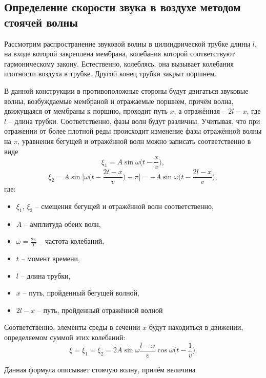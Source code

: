 \documentclass[referat,times]{SCWorks}
\begin{document}
\subsection{Определение скорости звука в воздухе методом стоячей волны}
\par Рассмотрим распространение звуковой волны в цилиндрической трубке длины $l$, на входе которой закреплена мембрана, колебания которой соответствуют гармоническому закону. Естественно, колеблясь, она вызывает колебания плотности воздуха в трубке. Другой конец трубки закрыт поршнем.
\par В данной конструкции в противоположные стороны будут двигаться звуковые волны, возбуждаемые мембраной и отражаемые поршнем, причём волна, движущаяся от мембраны к поршню, проходит путь $x$, а отражённая -- $2l - x$, где $l$ -- длина трубки. Соответственно, фазы волн будут различны. Учитывая, что при отражении от более плотной реды происходит изменение фазы отражённой волны на $\pi$, уравнения бегущей и отражённой волн можно записать соответственно в виде
\begin{equation}
    \xi_1 = A \sin{\omega\bigg(t - \frac x v\bigg)},
\end{equation}
\begin{equation}
    \xi_2 = A \sin \bigg[\omega\bigg(t - \frac{2t - x}{v}\bigg) - \pi\bigg] = - A \sin{\omega\bigg(t - \frac{2 l - x}{v}\bigg)},
\end{equation}
где:
\begin{itemize}
    \item $\xi_1$, $\xi_2$ -- смещения бегущей и отражённой волн соответственно,
    \item $A$ -- амплитуда обеих волн,
    \item $\omega=\frac{2\pi}{T}$ -- частота колебаний,
    \item $t$ -- момент времени,
    \item $l$ -- длина трубки,
    \item $x$ -- путь, пройденный бегущей волной,
    \item $2l - x$ -- путь, пройденный отражённой волной
\end{itemize}
\par Соответственно, элементы среды в сечении $x$ будут находиться в движении, определяемом суммой этих колебаний:
\begin{equation}
    \xi = \xi_1 = \xi_2 = 2A \sin{\omega \frac{l - x}{v}} \cos{\omega\bigg(t - \frac 1 v\bigg)}.
\end{equation}
\par Данная формула описывает стоячую волну, причём величина
\end{document}
